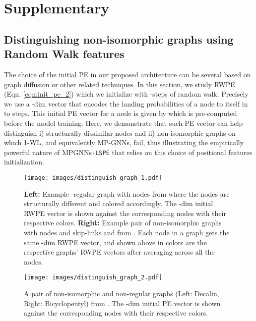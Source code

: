 \documentclass{article} \usepackage{iclr2021_conference,times}
\begin{document}



\newpage
\appendix
\section{Supplementary}
\label{sec:supplementary}

\subsection{Distinguishing non-isomorphic graphs using Random Walk features}
\label{sec:supplementary_power}

The choice of the initial PE in our proposed architecture can be several based on graph diffusion or other related techniques. In this section, we study RWPE (Eqn. \ref{eqn:init_pe_2}) which we initialize with -steps of random walk. Precisely we use a -dim vector that encodes the landing probabilities of a node  to itself in  to  steps. This initial PE vector for a node  is given by  which is pre-computed before the model training. Here, we demonstrate that such PE vector can help distinguish i) structurally dissimilar nodes and ii) non-isomorphic graphs on which 1-WL, and equivalently MP-GNNs, fail, thus illustrating the empirically powerful nature of MPGNNs\texttt{-LSPE} that relies on this choice of positional features initialization.

\begin{figure}[h]
\texttt{[image: images/distinguish\_graph\_1.pdf]}
\caption{\textbf{Left:} Example -regular graph with  nodes from \cite{li2020distance} where the nodes are structurally different and colored accordingly. The -dim initial RWPE vector is shown against the corresponding nodes with their respective colors. \textbf{Right:} Example pair of non-isomorphic graphs with  nodes and skip-links  and  from \cite{murphy2019relational}. Each node in a graph gets the same -dim RWPE vector, and shown above in colors are the respective graphs' RWPE vectors after averaging across all the nodes.}
\label{fig:distinguish_nodes_1}
\end{figure}

\begin{figure}[h]
\centering
\texttt{[image: images/distinguish\_graph\_2.pdf]}
\caption{A pair of non-isomorphic and non-regular graphs (Left: Decalin, Right: Bicyclopentyl) from \cite{sato2020survey}. The -dim initial PE vector is shown against the corresponding nodes with their respective colors.}
\label{fig:distinguish_nodes_2}
\end{figure}
\end{document}
